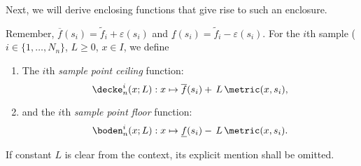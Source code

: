 Next, we will derive enclosing functions that give rise to such an enclosure.

\begin{defn}
\label{def:sampleceilandfloormultidim}
Remember, $\overline f(s_i) = \tilde f_i + \varepsilon(s_i)$ and $\underline f(s_i) = \tilde f_i - \varepsilon(s_i)$.  For the $i$th sample ($i \in \{1,\ldots,N_n\}$, $L \geq 0$, $x \in I$, we define  
\begin{enumerate}
	\item The $i$th \emph{sample point ceiling} function: \[\decke_n^i (x; L) :x \mapsto  \overline f (s_i) +  \,L \, \metric(x, s_i), \]
	\item and the $i$th \emph{sample point floor} function: \[\boden_n^i (x; L) :x \mapsto  \underline f (s_i) -  \,L \, \metric(x, s_i) .\] 
\end{enumerate}
If constant $L$ is clear from the context, its explicit mention shall be omitted.
\end{defn}

